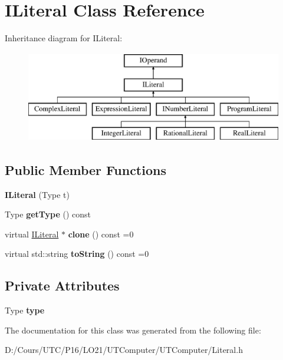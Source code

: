 \hypertarget{class_i_literal}{}\section{I\+Literal Class Reference}
\label{class_i_literal}
Inheritance diagram for I\+Literal\+:\begin{figure}[H]
\begin{center}
\leavevmode
\includegraphics[height=4.000000cm]{class_i_literal}
\end{center}
\end{figure}
\subsection*{Public Member Functions}
\begin{DoxyCompactItemize}
\item 
{\bfseries I\+Literal} (Type t)\hypertarget{class_i_literal_a82cf0d3e5939947c74ae1003872a1831}{}\label{class_i_literal_a82cf0d3e5939947c74ae1003872a1831}

\item 
Type {\bfseries get\+Type} () const \hypertarget{class_i_literal_a308a0079f71f1b22fb68566928ad8593}{}\label{class_i_literal_a308a0079f71f1b22fb68566928ad8593}

\item 
virtual \hyperlink{class_i_literal}{I\+Literal} $\ast$ {\bfseries clone} () const  =0\hypertarget{class_i_literal_a18e8a77a2b1cbce93a4e229e7fa0d5b5}{}\label{class_i_literal_a18e8a77a2b1cbce93a4e229e7fa0d5b5}

\item 
virtual std\+::string {\bfseries to\+String} () const  =0\hypertarget{class_i_literal_a5e3fe54e568565e245103bfb02a23e25}{}\label{class_i_literal_a5e3fe54e568565e245103bfb02a23e25}

\end{DoxyCompactItemize}
\subsection*{Private Attributes}
\begin{DoxyCompactItemize}
\item 
Type {\bfseries type}\hypertarget{class_i_literal_aa8c61fb5f5a54b7e614fc5b8b6dd9d4d}{}\label{class_i_literal_aa8c61fb5f5a54b7e614fc5b8b6dd9d4d}

\end{DoxyCompactItemize}


The documentation for this class was generated from the following file\+:\begin{DoxyCompactItemize}
\item 
D\+:/\+Cours/\+U\+T\+C/\+P16/\+L\+O21/\+U\+T\+Computer/\+U\+T\+Computer/Literal.\+h\end{DoxyCompactItemize}
